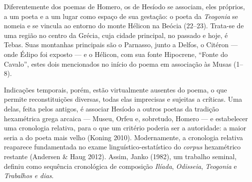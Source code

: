 Diferentemente dos poemas de Homero, os de Hesíodo se associam, eles
próprios, a um poeta e a um lugar como espaço de sua gestação: o poeta
da \textit{Teogonia} se nomeia e se vincula ao entorno do monte Hélicon na
Beócia (22--23). Trata-se de uma região no centro da Grécia, cuja cidade
principal, no passado e hoje, é Tebas. Suas montanhas principais são o
Parnasso, junto a Delfos, o Citéron --- onde Édipo foi exposto --- e o
Hélicon, com sua fonte Hipocrene, ``Fonte do Cavalo'', estes dois
mencionados no início do poema em associação às Musas (1--8).

Indicações temporais, porém, estão virtualmente ausentes do poema, o que
permite reconstituições diversas, todas elas imprecisas e sujeitas a
críticas. Uma delas, feita pelos antigos, é associar Hesíodo a outros
poetas da tradição hexamétrica grega arcaica --- Museu, Orfeu e,
sobretudo, Homero --- e estabelecer uma cronologia relativa, para o que
um critério poderia ser a autoridade: a maior seria a do poeta mais
velho (Koning 2010). Modernamente, a cronologia relativa reaparece
fundamentada no exame linguístico-estatístico do \textit{corpus}
hexamétrico restante (Andersen \& Haug 2012). Assim, Janko (1982), um
trabalho seminal, definiu como sequência cronológica de composição
\textit{Ilíada}, \textit{Odisseia}, \textit{Teogonia} e \textit{Trabalhos e
dias}.


